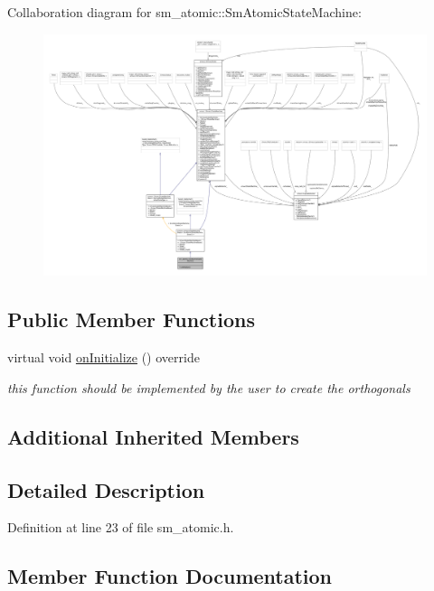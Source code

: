 Collaboration diagram for sm\+\_\+atomic\+:\+:Sm\+Atomic\+State\+Machine\+:
\nopagebreak
\begin{figure}[H]
\begin{center}
\leavevmode
\includegraphics[width=350pt]{structsm__atomic_1_1SmAtomicStateMachine__coll__graph}
\end{center}
\end{figure}
\subsection*{Public Member Functions}
\begin{DoxyCompactItemize}
\item 
virtual void \hyperlink{structsm__atomic_1_1SmAtomicStateMachine_a607f4bbb5f0a3323293f59837bc55284}{on\+Initialize} () override
\begin{DoxyCompactList}\small\item\em this function should be implemented by the user to create the orthogonals \end{DoxyCompactList}\end{DoxyCompactItemize}
\subsection*{Additional Inherited Members}


\subsection{Detailed Description}


Definition at line 23 of file sm\+\_\+atomic.\+h.



\subsection{Member Function Documentation}
